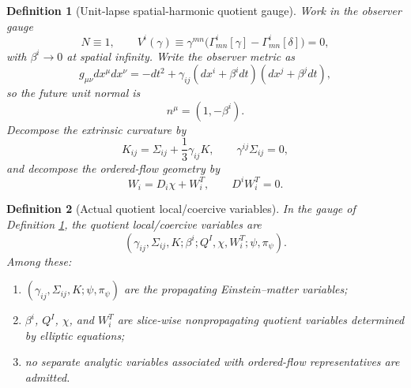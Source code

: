 \documentclass[11pt]{article}
\newtheorem{definition}{Definition}
\begin{document}
\begin{definition}[Unit-lapse spatial-harmonic quotient gauge]
\label{def:gauge}
Work in the observer gauge
\begin{equation}
N\equiv 1,
\qquad
V^i(\gamma)\equiv \gamma^{mn}\bigl(\Gamma^i_{mn}[\gamma]-\Gamma^i_{mn}[\delta]\bigr)=0,
\label{eq:gauge}
\end{equation}
with \(\beta^i\to 0\) at spatial infinity. Write the observer metric as
\begin{equation}
g_{\mu\nu}dx^\mu dx^\nu
=
-dt^2
+\gamma_{ij}(dx^i+\beta^idt)(dx^j+\beta^jdt),
\label{eq:ADM}
\end{equation}
so the future unit normal is
\begin{equation}
n^\mu=(1,-\beta^i).
\label{eq:normal}
\end{equation}
Decompose the extrinsic curvature by
\begin{equation}
K_{ij}
=
\Sigma_{ij}+\frac13\gamma_{ij}K,
\qquad
\gamma^{ij}\Sigma_{ij}=0,
\label{eq:Ksplit}
\end{equation}
and decompose the ordered-flow geometry by
\begin{equation}
W_i=D_i\chi+W_i^T,
\qquad
D^iW_i^T=0.
\label{eq:Wdecomp}
\end{equation}
\end{definition}

\begin{definition}[Actual quotient local/coercive variables]
\label{def:variables}
In the gauge of Definition \ref{def:gauge}, the quotient local/coercive variables are
\begin{equation}
(\gamma_{ij},\Sigma_{ij},K;\beta^i;Q^I,\chi,W_i^T;\psi,\pi_\psi).
\label{eq:variables}
\end{equation}
Among these:
\begin{enumerate}
    \item \((\gamma_{ij},\Sigma_{ij},K;\psi,\pi_\psi)\) are the propagating Einstein--matter variables;
    \item \(\beta^i\), \(Q^I\), \(\chi\), and \(W_i^T\) are slice-wise nonpropagating quotient variables determined by elliptic equations;
    \item no separate analytic variables associated with ordered-flow representatives are admitted.
\end{enumerate}
\end{definition}
\end{document}
